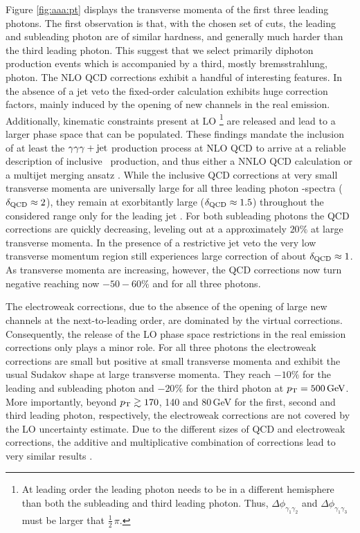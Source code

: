 Figure \ref{fig:aaa:pt} displays the transverse momenta of the 
first three leading photons. 
The first observation is that, with the chosen set of cuts, 
the leading and subleading photon are of similar hardness, 
and generally much harder than the third leading photon. 
This suggest that we select primarily diphoton production events 
which is accompanied by a third, mostly bremsstrahlung, photon. 
The NLO QCD corrections exhibit a handful of interesting features. 
In the absence of a jet veto the fixed-order calculation 
exhibits huge correction factors, mainly induced by the 
opening of new channels in the real emission. 
Additionally, kinematic constraints present at LO \footnote{
  At leading order the leading photon needs to be in a different 
  hemisphere than both the subleading and third leading photon. 
  Thus, $\Delta\phi_{\gamma_1\gamma_2}$ and $\Delta\phi_{\gamma_1\gamma_3}$ 
  must be larger that $\tfrac{1}{2}\,\pi$.
} are released and 
lead to a larger phase space that can be populated. 
These findings mandate the inclusion of at least the $\gamma\gamma\gamma+\text{jet}$ 
production process at NLO QCD to arrive at a reliable description 
of inclusive \aaa\ production, and thus either a NNLO QCD calculation 
or a multijet merging ansatz \cite{Hoeche:2012yf,Kallweit:2015dum}. 
While the inclusive QCD corrections at very small transverse momenta 
are universally large for all three leading photon \pT-spectra 
($\delta_\text{QCD}\approx 2$), they remain at exorbitantly large 
($\delta_\text{QCD}\approx 1.5$) throughout the considered range 
only for the leading jet \pT. 
For both subleading photons the QCD corrections are quickly 
decreasing, leveling out at a approximately $20\%$ at large transverse 
momenta.
In the presence of a restrictive jet veto the very low transverse 
momentum region still experiences large correction of about 
$\delta_\text{QCD}\approx 1$. 
As transverse momenta are increasing, however, the QCD corrections now turn 
negative reaching now $-50-60\%$ and for all three photons. 

The electroweak corrections, due to the absence of the opening 
of large new channels at the next-to-leading order, are dominated 
by the virtual corrections. 
Consequently, the release of the LO phase space restrictions 
in the real emission corrections only plays a minor role.
For all three photons the electroweak corrections are small but 
positive at small transverse momenta and exhibit the usual 
Sudakov shape at large transverse momenta.
They reach $-10\%$ for the leading and subleading photon and 
$-20\%$ for the third photon at $p_\text{T}=500\,\text{GeV}$. 
More importantly, beyond $p_\text{T}\gtrsim 170$, 140 and 80\,GeV 
for the first, second and third leading photon, respectively, 
the electroweak corrections are not covered by the LO 
uncertainty estimate.
Due to the different sizes of QCD and electroweak 
corrections, \revised{$\deltaQCD\gg\deltaEW$,} the additive and multiplicative combination 
of corrections lead to very similar results 
.

